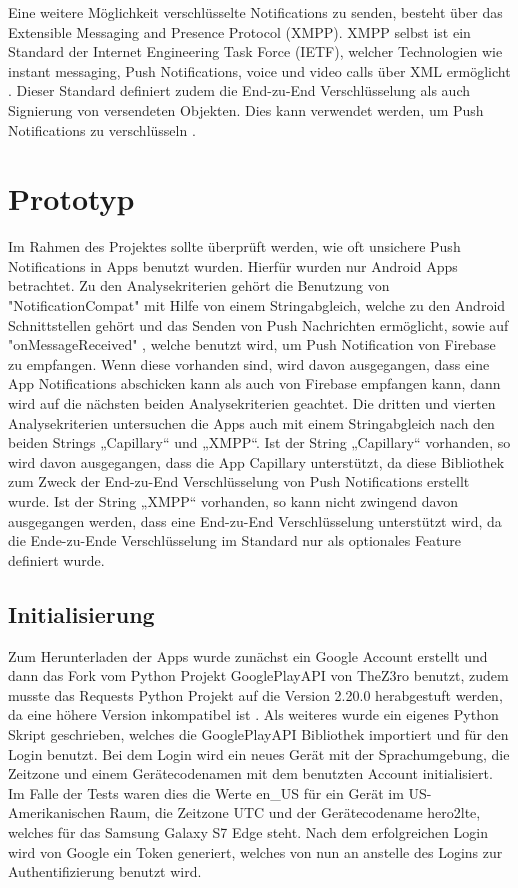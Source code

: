 \documentclass[sigconf]{acmart}
\begin{document}
Eine weitere Möglichkeit verschlüsselte Notifications zu senden, 
besteht über das Extensible Messaging and Presence Protocol (XMPP).
XMPP selbst ist ein Standard der Internet Engineering Task Force (IETF), 
welcher Technologien wie instant messaging, Push Notifications, voice und 
video calls über XML ermöglicht \cite{xmpp}\cite{xmpp3}.  Dieser Standard definiert zudem die 
End-zu-End Verschlüsselung als auch Signierung von versendeten Objekten. 
Dies kann verwendet werden, um Push Notifications zu verschlüsseln \cite{xmpp2}.

\section{Prototyp}

Im Rahmen des Projektes sollte überprüft werden, wie oft unsichere Push 
Notifications in Apps benutzt wurden. Hierfür wurden nur Android Apps 
betrachtet. Zu den Analysekriterien gehört die Benutzung von 
"NotificationCompat" \cite{google} mit Hilfe von einem Stringabgleich, welche zu den 
Android Schnittstellen gehört und das Senden von Push Nachrichten ermöglicht, sowie auf "onMessageReceived" \cite{firebase3}, welche 
benutzt wird, um Push Notification von Firebase zu empfangen. 
Wenn diese vorhanden sind, wird davon ausgegangen, dass eine App 
Notifications abschicken kann als auch von Firebase empfangen kann, dann wird auf die nächsten beiden 
Analysekriterien geachtet.
Die dritten und vierten Analysekriterien untersuchen die Apps auch mit 
einem Stringabgleich nach den beiden Strings „Capillary“ und „XMPP“. Ist 
der String „Capillary“ vorhanden, so wird davon ausgegangen, dass die App 
Capillary unterstützt, da diese Bibliothek zum Zweck der End-zu-End 
Verschlüsselung von Push Notifications erstellt wurde. Ist der String „XMPP“ 
vorhanden, so kann nicht zwingend davon ausgegangen werden, dass eine 
End-zu-End Verschlüsselung unterstützt wird, da die Ende-zu-Ende 
Verschlüsselung im Standard nur als optionales Feature definiert wurde.

\subsection{Initialisierung}
Zum Herunterladen der Apps wurde zunächst ein Google Account erstellt und dann
das Fork vom Python Projekt GooglePlayAPI 
von TheZ3ro \cite{googleplayapi} benutzt, zudem musste das Requests Python Projekt auf die Version 
2.20.0 herabgestuft werden, da eine höhere Version inkompatibel ist \cite{googleplayapi1}. 
Als weiteres wurde ein eigenes Python Skript geschrieben, welches die 
GooglePlayAPI Bibliothek importiert und für den Login benutzt. Bei dem Login 
wird ein neues Gerät mit der Sprachumgebung, die Zeitzone und einem 
Gerätecodenamen mit dem benutzten Account initialisiert. Im Falle der Tests 
waren dies die Werte en\_US für ein Gerät im US-Amerikanischen Raum, die 
Zeitzone UTC und der Gerätecodename hero2lte, welches für das Samsung 
Galaxy S7 Edge steht. Nach dem erfolgreichen Login wird von Google ein Token generiert, 
welches von nun an anstelle des Logins zur Authentifizierung benutzt wird.
\end{document}
